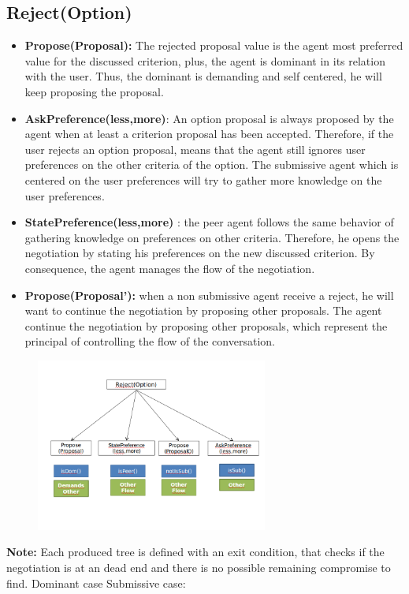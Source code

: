 \documentclass{llncs}
\begin{document}
	\subsection{Reject(Option)}
\begin{itemize}
	\item \textbf{Propose(Proposal):} The rejected proposal value is the agent most preferred value for the discussed criterion, plus, the agent is dominant in its relation with the user. Thus, the dominant is demanding and self centered, he will keep proposing the proposal.

	\item \textbf{AskPreference(less,more)}: An option proposal is always proposed by the agent when at least a criterion proposal has been accepted. Therefore, if the user rejects an option proposal, means that the agent still ignores user preferences on the other criteria of the option. The submissive agent which is centered on the user preferences will try to gather more knowledge on the user preferences.

	\item \textbf{StatePreference(less,more)} : the peer agent follows the same behavior of gathering knowledge on preferences on other criteria. Therefore, he opens the negotiation by stating his preferences on the new discussed criterion. By consequence, the agent manages the flow of the negotiation. 
	
	\item \textbf{Propose(Proposal'):} when a non submissive agent receive a reject, he will want to continue the negotiation by proposing other proposals. The agent continue the negotiation by proposing other proposals, which represent the principal of controlling the flow of the conversation.
\end{itemize}
\begin{figure}[]
		\centerline{\includegraphics[width=3in]{figs/utterances_v2/RejectOption.png}}
		\vskip 8pt
\end{figure}

\textbf{Note:} Each produced tree is defined with an exit condition, that checks if the negotiation is at an dead end and there is no possible remaining compromise to find.
	Dominant case
	Submissive case:
\end{document}
